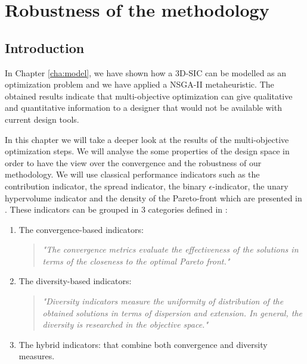 \chapter{Robustness of the methodology}
\label{cha:robustness}

\begin{summary}
\lipsum[1]
\end{summary}

\section{Introduction}
In Chapter \ref{cha:model}, we have shown how a 3D-SIC can be modelled as an optimization problem and we have applied a NSGA-II metaheuristic. The obtained results indicate that multi-objective optimization can give qualitative and quantitative information to a designer that would not be available with current design tools.

In this chapter we will take a deeper look at the results of the multi-objective optimization steps. We will analyse the some properties of the design space in order to have the view over the convergence and the robustness of our methodology. We will use classical performance indicators such as the contribution indicator, the spread indicator, the binary $\epsilon$-indicator, the unary hypervolume indicator and the density of the Pareto-front which are presented in \cite{talbi09, 1197687}. These indicators can be grouped in 3 categories defined in \cite{talbi09}:
\begin{enumerate}
	\item The convergence-based indicators:
	\begin{quote}
		\emph{"The convergence metrics evaluate the effectiveness of the solutions in terms of the closeness to the optimal Pareto front."}
	\end{quote}
	\item The diversity-based indicators:
	\begin{quote}
		\emph{"Diversity indicators measure the uniformity of distribution of the obtained solutions in terms of dispersion and extension. In general, the diversity is researched in the objective space."}
	\end{quote}
	\item The hybrid indicators: that combine both convergence and diversity measures.
\end{enumerate}


